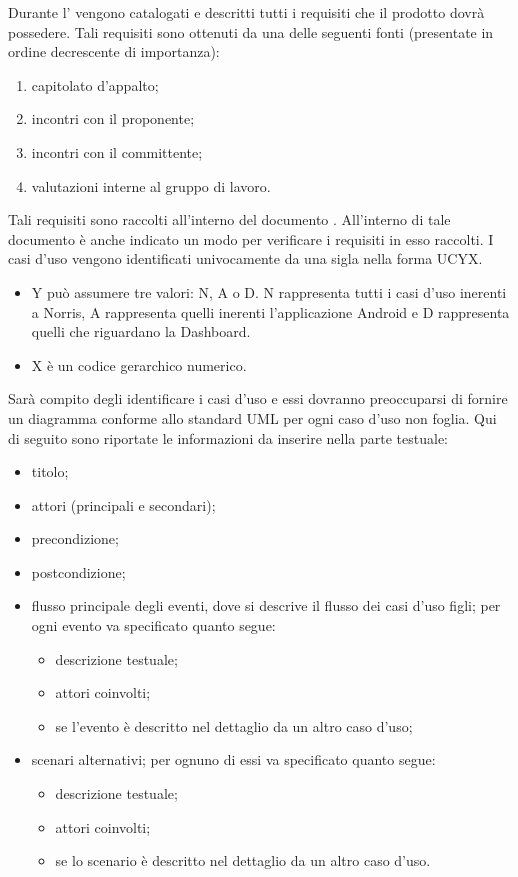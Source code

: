 			Durante l' vengono catalogati e descritti tutti i requisiti che il prodotto dovrà possedere. Tali requisiti sono ottenuti da una delle seguenti fonti (presentate in ordine decrescente di importanza):
			\begin{enumerate}
				\item capitolato d’appalto;
				\item incontri con il proponente;
				\item incontri con il committente;
				\item valutazioni interne al gruppo di lavoro.
			\end{enumerate}
			Tali requisiti sono raccolti all'interno del documento . All'interno di tale documento è anche indicato un modo per verificare i requisiti in esso raccolti.
				 \label{sec:classificazioneUC}
					I casi d'uso vengono identificati univocamente da una sigla nella forma UCYX.
					\begin{itemize}
						\item Y può assumere tre valori: N, A o D. N rappresenta tutti i casi d'uso inerenti a Norris, A rappresenta quelli inerenti l'applicazione Android e D rappresenta quelli che riguardano la Dashboard.
						\item X è un codice gerarchico numerico.
					\end{itemize}
					Sarà compito degli  identificare i casi d'uso e essi dovranno preoccuparsi di fornire un diagramma conforme allo standard UML per ogni caso d'uso non foglia. Qui di seguito sono riportate le informazioni da inserire nella parte testuale:
					\begin{itemize}
						\item titolo;
						\item attori (principali e secondari);
						\item precondizione;
						\item postcondizione;
						\item flusso principale degli eventi, dove si descrive il flusso dei casi d'uso figli; per ogni evento va specificato quanto segue:
						\begin{itemize}
							\item descrizione testuale;
							\item attori coinvolti;
							\item se l’evento è descritto nel dettaglio da un altro caso d’uso;
						\end{itemize}
						\item scenari alternativi; per ognuno di essi va specificato quanto segue:
						\begin{itemize}
							\item descrizione testuale;
							\item attori coinvolti;
							\item se lo scenario è descritto nel dettaglio da un altro caso d’uso.
						\end{itemize}
					\end{itemize}
